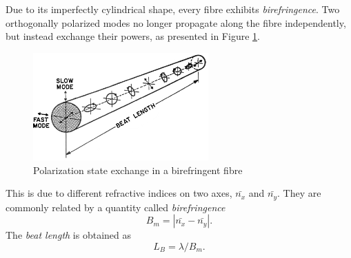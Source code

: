 \documentclass{standalone}
\begin{document}
Due to its imperfectly cylindrical shape, every fibre exhibits \textit{birefringence}. Two orthogonally polarized modes no longer propagate along the fibre independently, but instead exchange their powers, as presented in Figure \ref{fig:birefringence}.
\begin{figure}[h]
	\centering
	\includegraphics[width=0.6\textwidth]{birefringence.png}
	\caption{Polarization state exchange in a birefringent fibre \cite{agrawal}}
	\label{fig:birefringence}
\end{figure}
This is due to different refractive indices on two axes, $\bar{n_x}$ and $\bar{n_y}$. They are commonly related by a quantity called \textit{birefringence}
\begin{equation}
B_m = \left| \bar{n_x} - \bar{n_y} \right| \textrm{.}
\end{equation}
The \textit{beat length} is obtained as
\begin{equation}
L_B = \lambda / B_m \textrm{.}
\end{equation} \\
\end{document}
